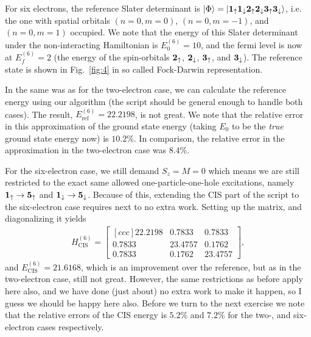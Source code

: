 \documentclass[a4paper]{article}
\newcommand{\bmat}[2]{\begin{bmatrix}[#1] #2 \end{bmatrix}}  %
\newcommand{\fig}[1]{Fig.\ \ref{fig:#1}}
\renewcommand{\u}[1]{{\bf #1}_\uparrow}
\renewcommand{\d}[1]{{\bf #1}_\downarrow}
\begin{document}
For six electrons, the reference Slater determinant is $|\Phi\rangle = |\u{1}\d{1}\u{2}\d{2}\u{3}\d{3}\rangle$, i.e. the one with spatial orbitals $(n=0,m=0)$, $(n=0,m=-1)$, and $(n=0,m=1)$ occupied. We note that the energy of this Slater determinant under the non-interacting Hamiltonian is $E_0^{(6)}=10$, and the fermi level is now at $E_f^{(6)}=2$ (the energy of the spin-orbitals $\u{2}$, $\d{2}$, $\u{3}$, and $\d{3}$). The reference state is shown in \fig{4} in so called Fock-Darwin representation.

In the same was as for the two-electron case, we can calculate the reference energy using our algorithm (the script should be general enough to handle both cases). The result, $E_\text{ref}^{(6)}=22.2198$, is not great. We note that the relative error in this approximation of the ground state energy (taking $E_0$ to be the \emph{true} ground state energy now) is $10.2\%$. In comparison, the relative error in the approximation in the two-electron case was $8.4\%$. 

For the six-electron case, we still demand $S_z=M=0$ which means we are still restricted to the exact same allowed one-particle-one-hole excitations, namely $\u{1}\rightarrow \u{5}$ and $\d{1}\rightarrow\d{5}$. Because of this, extending the CIS part of the script to the six-electron case requires next to no extra work. Setting up the matrix, and diagonalizing it yields
\begin{align}
H_\text{CIS}^{(6)} = \bmat{ccc}{22.2198    & 0.7833    & 0.7833 \\
0.7833  & 23.4757   & 0.1762 \\
0.7833  &  0.1762  & 23.4757},
\end{align}
and $E_\text{CIS}^{(6)}=21.6168$, which is an improvement over the reference, but as in the two-electron case, still not great. However, the same restrictions as before apply here also, and we have done (just about) no extra work to make it happen, so I guess we should be happy here also. Before we turn to the next exercise we note that the relative errors of the CIS energy is $5.2\%$ and $7.2\%$ for the two-, and six-electron cases respectively.
\end{document}
